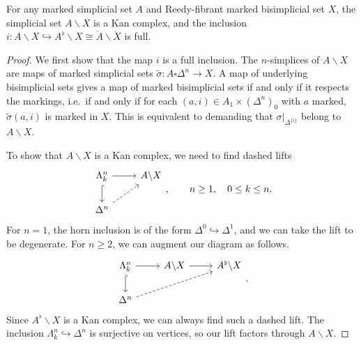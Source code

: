 \documentclass[main.tex]{subfiles}
\begin{document}
\begin{lemma}
  For any marked simplicial set $A$ and Reedy-fibrant marked bisimplicial set $X$, the simplicial set $A \backslash X$ is a Kan complex, and the inclusion $i\colon A \backslash X \hookrightarrow A^{\flat} \backslash X \cong \mathring{A} \backslash \mathring{X}$ is full.
\end{lemma}
\begin{proof}
  We first show that the map $i$ is a full inclusion. The $n$-simplices of $A \backslash X$ are maps of marked simplicial sets $\tilde{\sigma}\colon A \square \Delta^{n} \to X$. A map of underlying bisimplicial sets gives a map of marked bisimplicial sets if and only if it respects the markings, i.e.\ if and only if for each $(a, i) \in A_{1} \times (\Delta^{n})_{0}$ with $a$ marked, $\tilde{\sigma}(a, i)$ is marked in $X$. This is equivalent to demanding that $\sigma|_{\Delta^{\{i\}}}$ belong to $A \backslash X$.

  To show that $A \backslash X$ is a Kan complex, we need to find dashed lifts
  \begin{equation*}
    \begin{tikzcd}
      \Lambda^{n}_{k}
      \arrow[r]
      \arrow[d, hook]
      & A \backslash X
      \\
      \Delta^{n}
      \arrow[ur, dashed]
    \end{tikzcd},
    \qquad n \geq 1,\quad 0 \leq k \leq n.
  \end{equation*}
  For $n = 1$, the horn inclusion is of the form $\Delta^{0} \hookrightarrow \Delta^{1}$, and we can take the lift to be degenerate. For $n \geq 2$, we can augment our diagram as follows.
  \begin{equation*}
    \begin{tikzcd}
      \Lambda^{n}_{k}
      \arrow[r]
      \arrow[d, hook]
      & A \backslash X
      \arrow[r]
      & A^{\flat} \backslash X
      \\
      \Delta^{n}
      \arrow[urr, dashed]
    \end{tikzcd}.
  \end{equation*}
  Since $A^{\flat} \backslash X$ is a Kan complex, we can always find such a dashed lift. The inclusion $\Lambda^{n}_{k} \hookrightarrow \Delta^{n}$ is surjective on vertices, so our lift factors through $A \backslash X$.
\end{proof}
\end{document}
